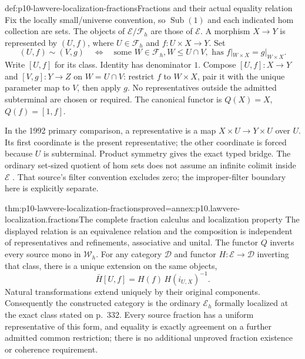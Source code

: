 \begin{hbdefinition}{def:p10-lawvere-localization-fractions}{Fractions and their actual equality relation}
Fix the locally small/universe convention, so \(\operatorname{Sub}(1)\)
and each indicated hom collection are sets.  The objects of
\(\mathcal E/\mathcal F_h\) are those of \(\mathcal E\).
A morphism \(X\to Y\) is represented by
\((U,f)\), where \(U\in\mathcal F_h\) and
\(f:U\times X\to Y\).  Set
\[
 (U,f)\sim(V,g)\quad\Longleftrightarrow\quad
 \text{some }W\in\mathcal F_h, W\leq U\cap V,
       \text{ has }f|_{W\times X}=g|_{W\times X}.
\]
Write \([U,f]\) for its class.  Identity has denominator
\(1\).  Compose \([U,f]:X\to Y\) and
\([V,g]:Y\to Z\) on \(W=U\cap V\): restrict
\(f\) to \(W\times X\), pair it with the unique
parameter map to \(V\), then apply \(g\).
No representatives outside the admitted subterminal are
chosen or required.  The canonical functor is
\(Q(X)=X\), \(Q(f)=[1,f]\).

In the 1992 primary comparison, a representative is a
map \(X\times U\to Y\times U\) over \(U\).
Its first coordinate is the present representative;
the other coordinate is forced because \(U\) is
subterminal.  Product symmetry gives the exact typed
bridge.  The ordinary set-sized quotient of hom sets
does not assume an infinite colimit inside \(\mathcal E\)
\cite[V\S9, pp.~258--260]{MacLaneMoerdijk1992}.
That source's filter convention excludes zero; the
improper-filter boundary here is explicitly separate.
\end{hbdefinition}

\begin{hbtheorem}{thm:p10-lawvere-localization-fractions}{proved=annex:p10.lawvere-localization.fractions}{The complete fraction calculus and localization property}
The displayed relation is an equivalence relation and
the composition is independent of representatives and
refinements, associative and unital.  The functor \(Q\)
inverts every source mono in \(\mathcal W_h\).
For any category \(\mathcal D\) and functor
\(H:\mathcal E\to\mathcal D\) inverting that class,
there is a unique extension on the same objects,
\[
 \bar H[U,f]=H(f)\,H(i_{U,X})^{-1}.
\]
Natural transformations extend uniquely by their original
components.  Consequently the constructed category is
the ordinary \(\mathcal E_h\) formally localized at
the exact class stated on p.~332.  Every source fraction
has a uniform representative of this form, and equality
is exactly agreement on a further admitted common
restriction; there is no additional unproved fraction
existence or coherence requirement.
\end{hbtheorem}

